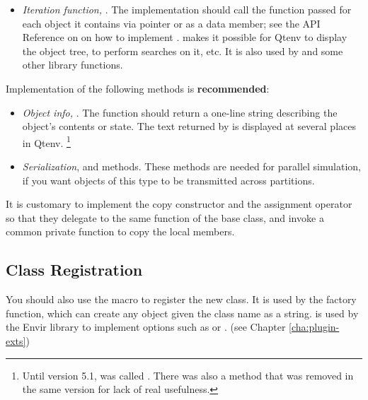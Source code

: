\begin{itemize}
  \item \textit{Iteration function,} .
        The implementation should call the function passed
        for each object it contains via pointer or as a data member;
        see the API Reference on  on how to implement
        .  makes it possible
        for Qtenv to display the object tree, to perform searches on it, etc.
        It is also used by  and some other library functions.
\end{itemize}

Implementation of the following methods is \textbf{recommended}:

\begin{itemize}
  \item \textit{Object info,} . The  function
        should return a one-line string describing the object's contents or state.
        The text returned by  is displayed at several places in Qtenv.
        \footnote{Until {\opp} version 5.1,  was called .
        There was also a  method that was removed in the
        same version for lack of real usefulness.}
  \item \textit{Serialization},  and  methods.
        These methods are needed for parallel simulation, if you want
        objects of this type to be transmitted across partitions.
\end{itemize}

It is customary to implement the copy constructor and the assignment operator
so that they delegate to the same function of the base class, and invoke a common
private  function to copy the local members.

\subsection{Class Registration}
\label{sec:sim-lib:class-registration}

You should also use the  macro to register the
new class. It is used by the  factory function, which can
create any object given the class name as a string. 
is used by the Envir library to implement  options
such as  or .
(see Chapter \ref{cha:plugin-exts})

